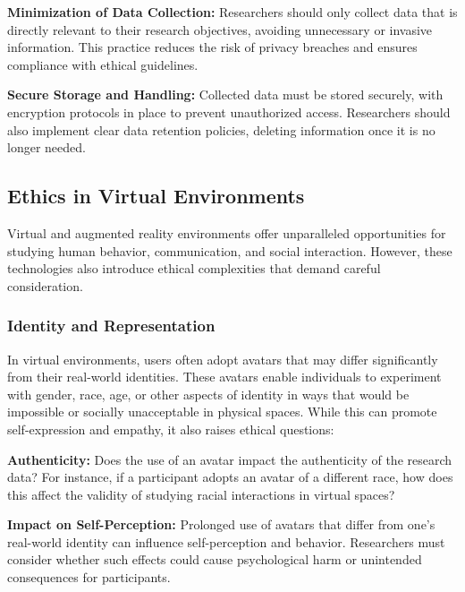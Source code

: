 \documentclass[
]{book}
\begin{document}
\textbf{Minimization of Data Collection:} Researchers should only collect data that is directly relevant to their research objectives, avoiding unnecessary or invasive information. This practice reduces the risk of privacy breaches and ensures compliance with ethical guidelines.

\textbf{Secure Storage and Handling:} Collected data must be stored securely, with encryption protocols in place to prevent unauthorized access. Researchers should also implement clear data retention policies, deleting information once it is no longer needed.

\subsection*{Ethics in Virtual Environments}\label{ethics-in-virtual-environments}

Virtual and augmented reality environments offer unparalleled opportunities for studying human behavior, communication, and social interaction. However, these technologies also introduce ethical complexities that demand careful consideration.

\subsubsection*{Identity and Representation}\label{identity-and-representation}

In virtual environments, users often adopt avatars that may differ significantly from their real-world identities. These avatars enable individuals to experiment with gender, race, age, or other aspects of identity in ways that would be impossible or socially unacceptable in physical spaces. While this can promote self-expression and empathy, it also raises ethical questions:

\textbf{Authenticity:} Does the use of an avatar impact the authenticity of the research data? For instance, if a participant adopts an avatar of a different race, how does this affect the validity of studying racial interactions in virtual spaces?

\textbf{Impact on Self-Perception:} Prolonged use of avatars that differ from one's real-world identity can influence self-perception and behavior. Researchers must consider whether such effects could cause psychological harm or unintended consequences for participants.
\end{document}

